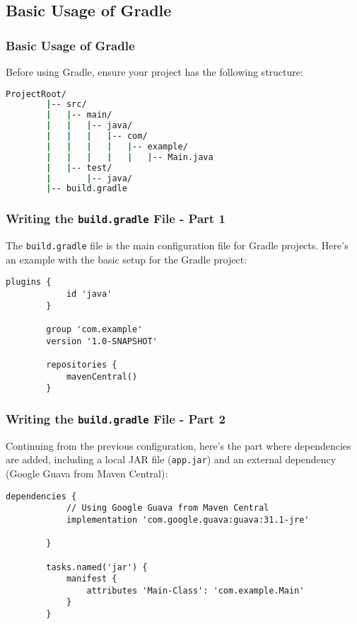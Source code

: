 \documentclass[aspectratio=169, table]{beamer}
\begin{document}
\subsection{Basic Usage of Gradle}
\begin{frame}[fragile]
	\frametitle{Basic Usage of Gradle}

	Before using Gradle, ensure your project has the following structure:
	\begin{lstlisting}[language=bash]
		ProjectRoot/
		|-- src/
		|   |-- main/
		|   |   |-- java/
		|   |   |   |-- com/
		|   |   |   |   |-- example/
		|   |   |   |   |   |-- Main.java
		|   |-- test/
		|       |-- java/
		|-- build.gradle
	\end{lstlisting}
\end{frame}


\begin{frame}[fragile]
	\frametitle{Writing the \texttt{build.gradle} File - Part 1}
	The \texttt{build.gradle} file is the main configuration file for Gradle projects. Here’s an example with the basic setup for the Gradle project:
	\begin{lstlisting}[style=XmlStyle]
		plugins {
			id 'java'
		}
		
		group 'com.example'
		version '1.0-SNAPSHOT'
		
		repositories {
			mavenCentral()
		}
	\end{lstlisting}
\end{frame}

\begin{frame}[fragile]
	\vspace{20pt}
	\frametitle{Writing the \texttt{build.gradle} File - Part 2}
	Continuing from the previous configuration, here’s the part where dependencies are added, including a local JAR file (\texttt{app.jar}) and an external dependency (Google Guava from Maven Central):
	\begin{lstlisting}[style=XmlStyle]
		dependencies {
			// Using Google Guava from Maven Central
			implementation 'com.google.guava:guava:31.1-jre'

		}
		
		tasks.named('jar') {
			manifest {
				attributes 'Main-Class': 'com.example.Main'
			}
		}
	\end{lstlisting}
\end{frame}
\end{document}
